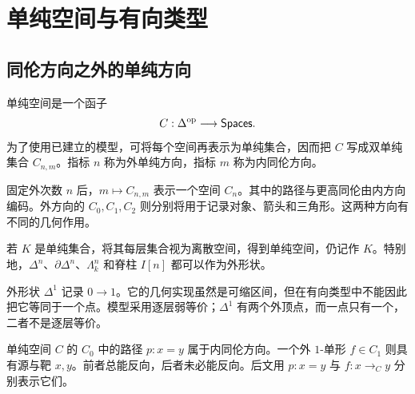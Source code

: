 \chapter{单纯空间与有向类型}
\section{同伦方向之外的单纯方向}
\begin{definition}[单纯空间]
单纯空间是一个函子
\[
C:\Delta^{\mathrm{op}}\longrightarrow\mathsf{Spaces}.
\]
为了使用已建立的模型，可将每个空间再表示为单纯集合，因而把 $C$ 写成双单纯集合 $C_{n,m}$。指标 $n$ 称为外单纯方向，指标 $m$ 称为内同伦方向。
\end{definition}
\begin{example}
固定外次数 $n$ 后，$m\mapsto C_{n,m}$ 表示一个空间 $C_n$。其中的路径与更高同伦由内方向编码。外方向的 $C_0,C_1,C_2$ 则分别将用于记录对象、箭头和三角形。这两种方向有不同的几何作用。
\end{example}
\begin{definition}[离散外形状]
若 $K$ 是单纯集合，将其每层集合视为离散空间，得到单纯空间，仍记作 $K$。特别地，$\Delta^n$、$\partial\Delta^n$、$\Lambda_k^n$ 和脊柱 $I[n]$ 都可以作为外形状。
\end{definition}
\begin{remark}
外形状 $\Delta^1$ 记录 $0\to1$。它的几何实现虽然是可缩区间，但在有向类型中不能因此把它等同于一个点。模型采用逐层弱等价；$\Delta^1$ 有两个外顶点，而一点只有一个，二者不是逐层等价。
\end{remark}
\begin{example}[两种不同的“路径”]
单纯空间 $C$ 的 $C_0$ 中的路径 $p:x=y$ 属于内同伦方向。一个外 $1$-单形 $f\in C_1$ 则具有源与靶 $x,y$。前者总能反向，后者未必能反向。后文用 $p:x=y$ 与 $f:x\to_Cy$ 分别表示它们。
\end{example}

